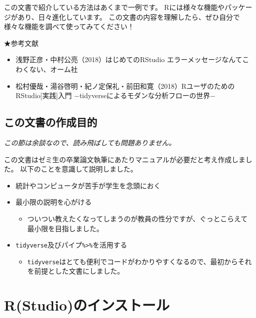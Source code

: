 \documentclass[]{book}
\providecommand{\tightlist}{%
  \setlength{\itemsep}{0pt}\setlength{\parskip}{0pt}}
\begin{document}
この文書で紹介している方法はあくまで一例です。
Rには様々な機能やパッケージがあり、日々進化しています。
この文書の内容を理解したら、ぜひ自分で様々な機能を調べて使ってみてください！

★参考文献

\begin{itemize}
\tightlist
\item
  浅野正彦・中村公亮（2018）はじめてのRStudio
  エラーメッセージなんてこわくない、オーム社
\item
  松村優哉・湯谷啓明・紀ノ定保礼・前田和寛（2018）RユーザのためのRStudio{[}実践{]}入門
  −tidyverseによるモダンな分析フローの世界−
\end{itemize}

\section{この文書の作成目的}\label{ux3053ux306eux6587ux66f8ux306eux4f5cux6210ux76eeux7684}

\emph{この節は余談なので、読み飛ばしても問題ありません。}

この文書はゼミ生の卒業論文執筆にあたりマニュアルが必要だと考え作成しました。
以下のことを意識して説明しました。

\begin{itemize}
\tightlist
\item
  統計やコンピュータが苦手が学生を念頭におく
\item
  最小限の説明を心がける

  \begin{itemize}
  \tightlist
  \item
    ついつい教えたくなってしまうのが教員の性分ですが、ぐっとこらえて最小限を目指しました。
  \end{itemize}
\item
  \texttt{tidyverse}及びパイプ\texttt{\%\textgreater{}\%}を活用する

  \begin{itemize}
  \tightlist
  \item
    \texttt{tidyverse}はとても便利でコードがわかりやすくなるので、最初からそれを前提とした文書にしました。
  \end{itemize}
\end{itemize}

\chapter{R(Studio)のインストール}\label{InstallR}
\end{document}
